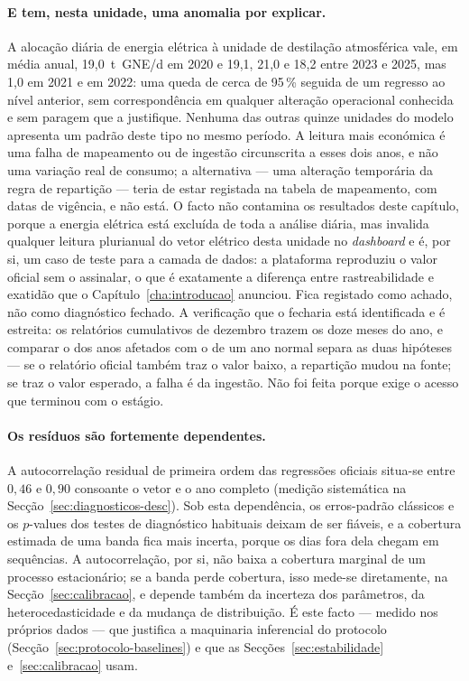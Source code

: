 \paragraph{E tem, nesta unidade, uma anomalia por explicar.} A alocação
diária de energia elétrica à unidade de destilação atmosférica vale, em
média anual, 19,0~t~GNE/d em 2020 e 19,1, 21,0 e 18,2 entre 2023 e 2025,
mas 1,0 em 2021 e em 2022: uma queda de cerca de 95\,\% seguida de um
regresso ao nível anterior, sem correspondência em qualquer alteração
operacional conhecida e sem paragem que a justifique. Nenhuma das outras
quinze unidades do modelo apresenta um padrão deste tipo no mesmo período.
A leitura mais económica é uma falha de mapeamento ou de ingestão
circunscrita a esses dois anos, e não uma variação real de consumo; a
alternativa --- uma alteração temporária da regra de repartição ---
teria de estar registada na tabela de mapeamento, com datas de vigência,
e não está. O facto não contamina os resultados deste capítulo, porque a
energia elétrica está excluída de toda a análise diária, mas invalida
qualquer leitura plurianual do vetor elétrico desta unidade no
\emph{dashboard} e é, por si, um caso de teste para a camada de dados: a
plataforma reproduziu o valor oficial sem o assinalar, o que é exatamente
a diferença entre rastreabilidade e exatidão que o
Capítulo~\ref{cha:introducao} anunciou. Fica registado como achado, não
como diagnóstico fechado. A verificação que o fecharia está identificada e
é estreita: os relatórios cumulativos de dezembro trazem os doze meses do
ano, e comparar o dos anos afetados com o de um ano normal separa as duas
hipóteses --- se o relatório oficial também traz o valor baixo, a repartição
mudou na fonte; se traz o valor esperado, a falha é da ingestão. Não foi
feita porque exige o acesso que terminou com o estágio.


\paragraph{Os resíduos são fortemente dependentes.} A autocorrelação residual
de primeira ordem das regressões oficiais situa-se entre $0{,}46$ e $0{,}90$
consoante o vetor e o ano completo (medição sistemática na
Secção~\ref{sec:diagnosticos-desc}). Sob esta dependência, os erros-padrão clássicos e
os $p$-values dos testes de diagnóstico habituais deixam de ser fiáveis, e a
cobertura estimada de uma banda fica mais incerta, porque os dias fora dela
chegam em sequências. A autocorrelação, por si, não baixa a cobertura
marginal de um processo estacionário; se a banda perde cobertura, isso
mede-se diretamente, na Secção~\ref{sec:calibracao}, e depende também da
incerteza dos parâmetros, da heterocedasticidade e da mudança de
distribuição. É este facto --- medido nos próprios dados --- que
justifica a maquinaria inferencial do protocolo
(Secção~\ref{sec:protocolo-baselines}) e que as Secções~\ref{sec:estabilidade}
e~\ref{sec:calibracao} usam.


